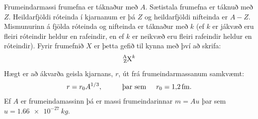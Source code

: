 \begin{tcolorbox}
Frumeindarmassi frumefna er táknaður með $A$. Sætistala frumefna er táknuð með $Z$. Heildarfjöldi róteinda í kjarnanum er þá $Z$ og heildarfjöldi nifteinda er $A-Z$. Mismunurinn á fjölda róteinda og nifteinda er táknaður með $k$ (ef $k$ er jákvæð eru fleiri róteindir heldur en rafeindir, en ef $k$ er neikvæð eru fleiri rafeindir heldur en róteindir). Fyrir frumefnið $X$ er þetta gefið til kynna með því að skrifa:
\begin{align*}
    \ce{^{A}_{Z}X^{k}}
\end{align*}
Hægt er að ákvarða geisla kjarnans, $r$, út frá frumeindarmassanum samkvæmt:
\begin{align*}
    r = r_0A^{1/3}, \hspace{1cm} \text{þar sem} \hspace{0.5cm} r_0 = \SI{1.2}{fm}.
\end{align*}
Ef $A$ er frumeindamassinn þá er massi frumeindarinnar $m = Au$ þar sem $u = \SI{1.66e-27}{kg}$.
\end{tcolorbox}

